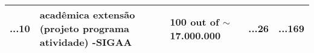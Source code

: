 \begin{table}[!htb]
\begin{tabular}{c|p{3cm}|l|p{1.5cm}|c}
    ...10                                          & acadêmica extensão (projeto \textbar{} programa \textbar{} atividade) -SIGAA & 100 out of $\sim$17.000.000    & ...26                                 & ...169         \\
    \toprule
  \end{tabular}
\end{table}